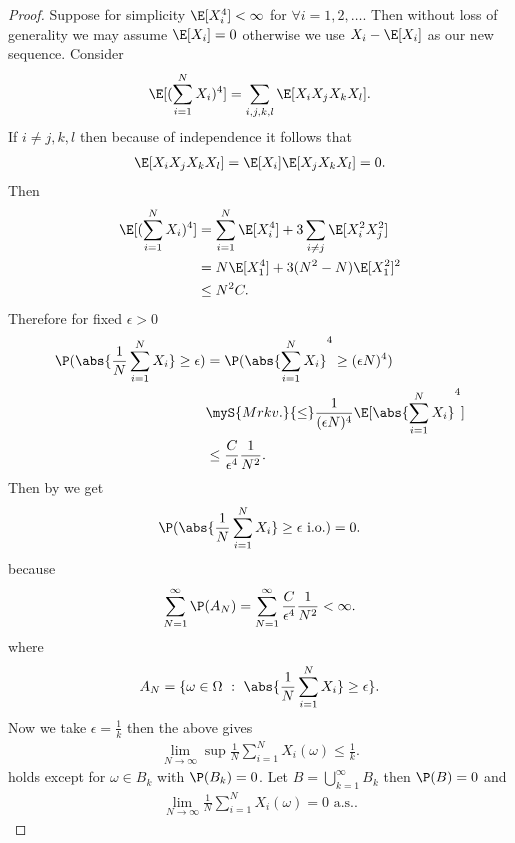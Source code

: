 \begin{proof}
  Suppose for simplicity $\E[X_i^{4} ] < \infty$  for $\forall  i = 1,2,\ldots $.
  Then without loss of generality we may assume $\E[X_i] = 0$ otherwise we use $X_i - \E[X_i]$ as our new sequence.
  Consider 
  \begin{align*}
    \E[(\sum_{i=1}^{N} X_i )^{4} ] = \sum_{i,j,k,l}\E[X_iX_jX_kX_l]
  .\end{align*}
  If $i \neq j ,k,l$ then because of independence it follows that 
  \begin{align*}
    \E[X_iX_jX_kX_l] = \E[X_i]\E[X_jX_kX_l] = 0
  .\end{align*}
  Then 
  \begin{align*}
    \E[(\sum_{i=1}^{N}X_i )^{4} ] &= \sum_{i=1}^{N}\E[X_i^{4} ]  + 3 \sum_{i\neq j}\E[X_i^2X_j^2] \\
                                  &= N\E[X_{1}^{4} ] + 3(N^2-N)\E[X_{1}^2]^2 \\
                                  &\le  N^2C
  .\end{align*}
  Therefore for fixed $\epsilon > 0$
  \begin{align*}
    \P(\abs{\frac{1}{N} \sum_{i=1}^{N}X_i } \ge \epsilon) &= \P(\abs{\sum_{i=1}^{N}X_i }^{4}  \ge (\epsilon N)^{4} )\\
                                                          &\myS{Mrkv.}{\le} \frac{1}{(\epsilon N)^{4} } \E[\abs{\sum_{i=1}^{N} X_i }^{4} ]\\
                                                          &\le  \frac{C}{\epsilon^4}\frac{1}{N^2}
  .\end{align*}
  Then by  we get 
  \begin{align*}
    \P(\abs{\frac{1}{N} \sum_{i=1}^{N} X_i } \ge  \epsilon \text{ i.o.}) = 0
  .\end{align*}
  because 
  \begin{align*}
    \sum_{N=1}^{\infty} \P(A_N)  = \sum_{N=1}^{\infty} \frac{C}{\epsilon^4}\frac{1}{N^2}  < \infty
  .\end{align*}
  where  
  \begin{align*}
    A_N = \{\omega  \in  \Omega  \ : \ \abs{\frac{1}{N}\sum_{i=1}^{N}X_i } \ge  \epsilon\}  
  .\end{align*}
  Now we take $\epsilon = \frac{1}{k}$ then the above gives 
  \begin{align*}
    \lim_{N\to \infty} \sup \frac{1}{N} \sum_{i=1}^{N}  X_i(\omega ) \le \frac{1}{k}
  .\end{align*}
  holds except for $\omega  \in  B_k$ with $\P(B_k) = 0$. Let $B = \bigcup_{k=1}^{\infty} B_k $ then $\P(B) = 0$ and
  \begin{align*}
    \lim_{N \to \infty} \frac{1}{N} \sum_{i=1}^{N} X_i(\omega ) = 0  \text{ a.s.}
  .\end{align*}
\end{proof}

